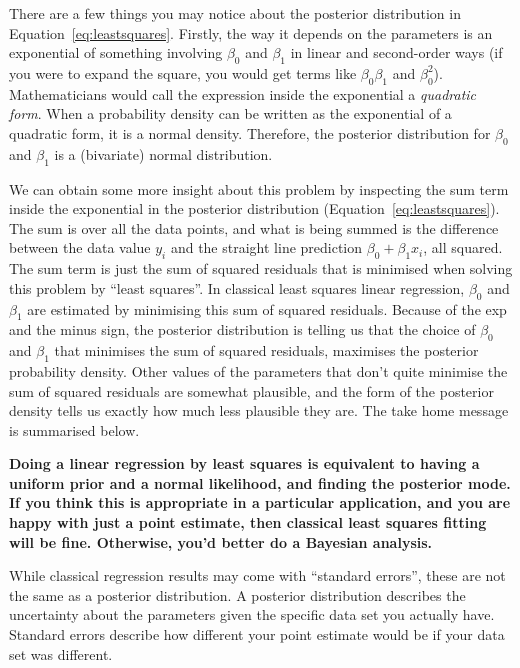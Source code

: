 There are a few things you may notice about the posterior distribution in
Equation~\ref{eq:leastsquares}. Firstly, the way it depends on the parameters
is an exponential of something involving $\beta_0$
and $\beta_1$ in linear and second-order ways (if you were to expand the square,
you would get terms like $\beta_0\beta_1$ and $\beta_0^2$). Mathematicians would
call the expression inside the exponential a {\it quadratic form}. When a
probability density can be written as the exponential of a quadratic form, it
is a normal density. Therefore, the posterior distribution for $\beta_0$ and
$\beta_1$ is a (bivariate) normal distribution.

We can obtain some more insight about this problem by inspecting the
sum term inside the exponential in the posterior distribution
(Equation~\ref{eq:leastsquares}). The sum is over all the data points, and
what is being summed is the difference between the data value $y_i$ and the
straight line prediction $\beta_0 + \beta_1 x_i$, all squared.
The sum term is just the sum of squared
residuals that is minimised when solving this problem by ``least squares''.
In classical least squares linear regression, $\beta_0$ and $\beta_1$ are
estimated by minimising this sum of squared residuals. Because of the exp and
the minus sign, the posterior distribution is telling us that the choice of
$\beta_0$ and $\beta_1$ that minimises the sum of squared residuals, maximises
the posterior probability density. Other values of the parameters that
don't quite minimise the sum of squared residuals are somewhat plausible, and
the form of the posterior density tells us exactly how much less plausible they
are. The take home message is summarised below.

\begin{framed}
{\bf Doing a linear regression by least squares is equivalent to having a
uniform prior and a normal likelihood, and finding the posterior mode.
If you think this is appropriate in a particular application, and you are happy
with just a point estimate, then classical
least squares fitting will be fine. Otherwise, you'd better do a Bayesian analysis.}
\end{framed}

While classical regression results may come with ``standard errors'', these are
not the same as a posterior distribution. A posterior distribution describes the
uncertainty about the parameters given the specific data set you actually have.
Standard errors describe how different your point estimate would be if your data
set was different.

